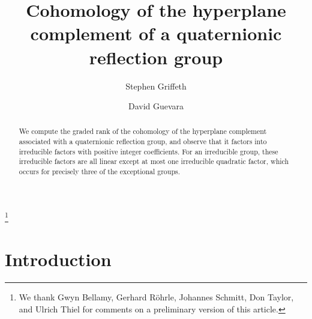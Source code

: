 \documentclass[11pt, reqno]{amsart}
\numberwithin{equation}{section}
\theoremstyle{definition}
\theoremstyle{plain}
\begin{document}
\title{Cohomology of the hyperplane complement of a quaternionic reflection group}

\author{Stephen Griffeth}

\author{David Guevara}

\address{Instituto de Matem\'aticas \\
Universidad de Talca  \\}




\begin{abstract}
We compute the graded rank of the cohomology of the hyperplane complement associated with a quaternionic reflection group, and observe that it factors into irreducible factors with positive integer coefficients. For an irreducible group, these irreducible factors are all linear except at most one irreducible quadratic factor, which occurs for precisely three of the exceptional groups. 
\end{abstract}

\thanks{We thank Gwyn Bellamy, Gerhard Röhrle, Johannes Schmitt, Don Taylor, and Ulrich Thiel for comments on a preliminary version of this article.}

\maketitle

\section{Introduction} 
\end{document}
